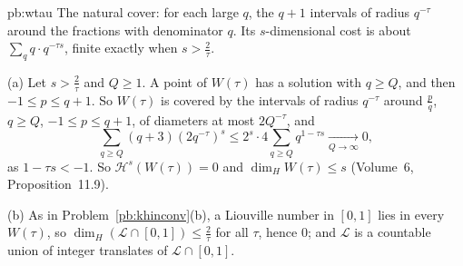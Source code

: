 \begin{solution}{pb:wtau}
\idea The natural cover: for each large $q$, the $q+1$ intervals of radius $q^{-\tau}$ around the fractions with denominator $q$. Its $s$-dimensional cost is about
$\sum_qq\cdot q^{-\tau s}$, finite exactly when $s>\frac2\tau$.

\writeup (a) Let $s>\frac2\tau$ and $Q\ge1$. A point of $W(\tau)$ has a solution with $q\ge Q$, and then $-1\le p\le q+1$. So $W(\tau)$ is covered by the intervals of
radius $q^{-\tau}$ around $\frac pq$, $q\ge Q$, $-1\le p\le q+1$, of diameters at most $2Q^{-\tau}$, and
\[
\sum_{q\ge Q}(q+3)(2q^{-\tau})^s\le2^s\cdot4\sum_{q\ge Q}q^{1-\tau s}\xrightarrow[Q\to\infty]{}0,
\]
as $1-\tau s<-1$. So $\mathcal H^s(W(\tau))=0$ and $\dim_HW(\tau)\le s$ (Volume~6, Proposition~11.9).

(b) As in Problem~\ref{pb:khinconv}(b), a Liouville number in $[0,1]$ lies in every $W(\tau)$, so $\dim_H(\mathcal L\cap[0,1])\le\frac2\tau$ for all $\tau$, hence $0$; and
$\mathcal L$ is a countable union of integer translates of $\mathcal L\cap[0,1]$.

\end{solution}

